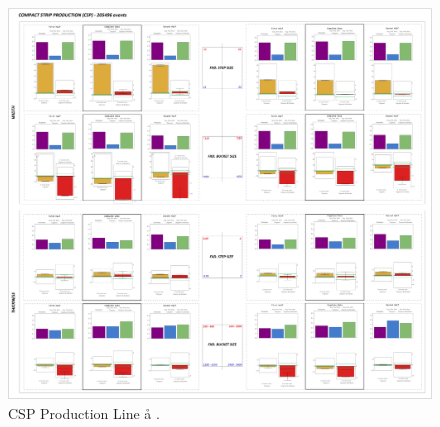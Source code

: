 \begin{landscape}
	\begin{figure}[ht]
		\centering
		\vspace*{-1.5cm}
		\captionsetup{width=1.1\linewidth}
		\includegraphics[width=1.2\textwidth]{../images/supplements-CSP_real_life_events_analysis-results.png}
		\caption{CSP Production Line \aa{} \bb{}.}
		\label{figure-supplements-CSP}
	\end{figure}
\end{landscape}